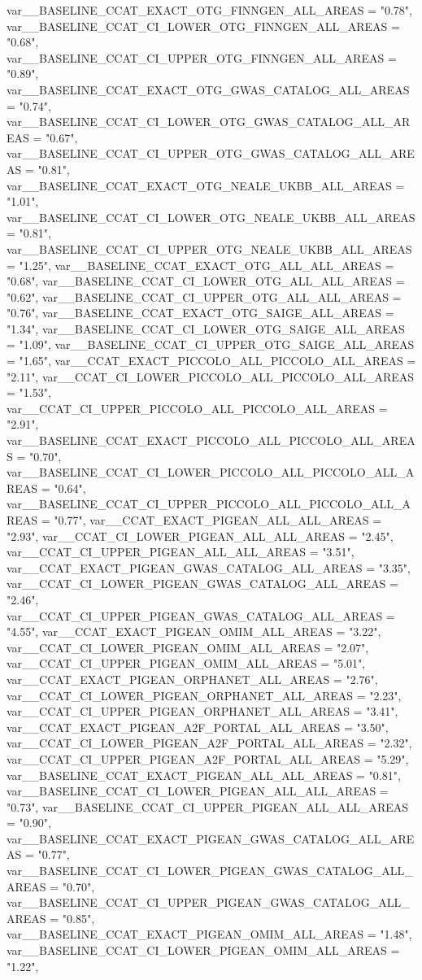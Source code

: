 \begin{luacode*}
{		var__BASELINE_CCAT_EXACT_OTG_FINNGEN_ALL_AREAS = "0.78",
		var__BASELINE_CCAT_CI_LOWER_OTG_FINNGEN_ALL_AREAS = "0.68",
		var__BASELINE_CCAT_CI_UPPER_OTG_FINNGEN_ALL_AREAS = "0.89",
		var__BASELINE_CCAT_EXACT_OTG_GWAS_CATALOG_ALL_AREAS = "0.74",
		var__BASELINE_CCAT_CI_LOWER_OTG_GWAS_CATALOG_ALL_AREAS = "0.67",
		var__BASELINE_CCAT_CI_UPPER_OTG_GWAS_CATALOG_ALL_AREAS = "0.81",
		var__BASELINE_CCAT_EXACT_OTG_NEALE_UKBB_ALL_AREAS = "1.01",
		var__BASELINE_CCAT_CI_LOWER_OTG_NEALE_UKBB_ALL_AREAS = "0.81",
		var__BASELINE_CCAT_CI_UPPER_OTG_NEALE_UKBB_ALL_AREAS = "1.25",
		var__BASELINE_CCAT_EXACT_OTG_ALL_ALL_AREAS = "0.68",
		var__BASELINE_CCAT_CI_LOWER_OTG_ALL_ALL_AREAS = "0.62",
		var__BASELINE_CCAT_CI_UPPER_OTG_ALL_ALL_AREAS = "0.76",
		var__BASELINE_CCAT_EXACT_OTG_SAIGE_ALL_AREAS = "1.34",
		var__BASELINE_CCAT_CI_LOWER_OTG_SAIGE_ALL_AREAS = "1.09",
		var__BASELINE_CCAT_CI_UPPER_OTG_SAIGE_ALL_AREAS = "1.65",
		var__CCAT_EXACT_PICCOLO_ALL_PICCOLO_ALL_AREAS = "2.11",
		var__CCAT_CI_LOWER_PICCOLO_ALL_PICCOLO_ALL_AREAS = "1.53",
		var__CCAT_CI_UPPER_PICCOLO_ALL_PICCOLO_ALL_AREAS = "2.91",
		var__BASELINE_CCAT_EXACT_PICCOLO_ALL_PICCOLO_ALL_AREAS = "0.70",
		var__BASELINE_CCAT_CI_LOWER_PICCOLO_ALL_PICCOLO_ALL_AREAS = "0.64",
		var__BASELINE_CCAT_CI_UPPER_PICCOLO_ALL_PICCOLO_ALL_AREAS = "0.77",
		var__CCAT_EXACT_PIGEAN_ALL_ALL_AREAS = "2.93",
		var__CCAT_CI_LOWER_PIGEAN_ALL_ALL_AREAS = "2.45",
		var__CCAT_CI_UPPER_PIGEAN_ALL_ALL_AREAS = "3.51",
		var__CCAT_EXACT_PIGEAN_GWAS_CATALOG_ALL_AREAS = "3.35",
		var__CCAT_CI_LOWER_PIGEAN_GWAS_CATALOG_ALL_AREAS = "2.46",
		var__CCAT_CI_UPPER_PIGEAN_GWAS_CATALOG_ALL_AREAS = "4.55",
		var__CCAT_EXACT_PIGEAN_OMIM_ALL_AREAS = "3.22",
		var__CCAT_CI_LOWER_PIGEAN_OMIM_ALL_AREAS = "2.07",
		var__CCAT_CI_UPPER_PIGEAN_OMIM_ALL_AREAS = "5.01",
		var__CCAT_EXACT_PIGEAN_ORPHANET_ALL_AREAS = "2.76",
		var__CCAT_CI_LOWER_PIGEAN_ORPHANET_ALL_AREAS = "2.23",
		var__CCAT_CI_UPPER_PIGEAN_ORPHANET_ALL_AREAS = "3.41",
		var__CCAT_EXACT_PIGEAN_A2F_PORTAL_ALL_AREAS = "3.50",
		var__CCAT_CI_LOWER_PIGEAN_A2F_PORTAL_ALL_AREAS = "2.32",
		var__CCAT_CI_UPPER_PIGEAN_A2F_PORTAL_ALL_AREAS = "5.29",
		var__BASELINE_CCAT_EXACT_PIGEAN_ALL_ALL_AREAS = "0.81",
		var__BASELINE_CCAT_CI_LOWER_PIGEAN_ALL_ALL_AREAS = "0.73",
		var__BASELINE_CCAT_CI_UPPER_PIGEAN_ALL_ALL_AREAS = "0.90",
		var__BASELINE_CCAT_EXACT_PIGEAN_GWAS_CATALOG_ALL_AREAS = "0.77",
		var__BASELINE_CCAT_CI_LOWER_PIGEAN_GWAS_CATALOG_ALL_AREAS = "0.70",
		var__BASELINE_CCAT_CI_UPPER_PIGEAN_GWAS_CATALOG_ALL_AREAS = "0.85",
		var__BASELINE_CCAT_EXACT_PIGEAN_OMIM_ALL_AREAS = "1.48",
		var__BASELINE_CCAT_CI_LOWER_PIGEAN_OMIM_ALL_AREAS = "1.22",
}
\end{luacode*}
